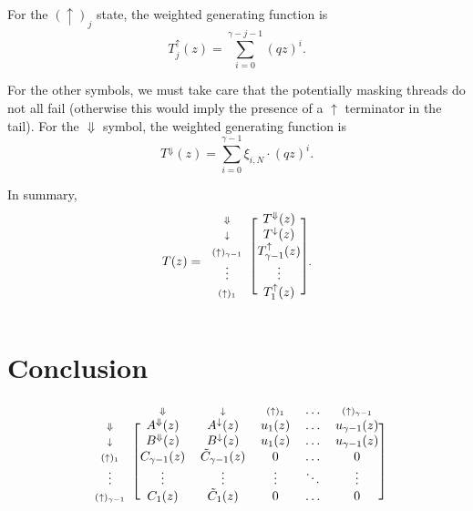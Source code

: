 \documentclass{article}
\newcommand{\DN}{\scriptstyle{\Downarrow}}
\newcommand{\dn}{\scriptstyle{\downarrow}}
\newcommand{\up}[1]{\scriptstyle{(\uparrow)_{#1}}}
\begin{document}
For the $(\uparrow)_j$ state, the weighted generating function is
\begin{equation}
T^\uparrow_j(z) = \sum_{i=0}^{\gamma-j-1} (qz)^i.
\end{equation}

For the other symbols, we must take care that the potentially masking
threads do not all fail (otherwise this would imply the presence of a
$\uparrow$ terminator in the tail). For the $\Downarrow$ symbol, the
weighted generating function is
\begin{equation}
T^\Downarrow(z) = \sum_{i=0}^{\gamma-1} \xi_{i,N} \cdot (qz)^i.
\end{equation}

In summary,
\begin{equation*}
T(z) = 
\begin{blockarray}{cc}
\begin{block}{c[c]}
\DN & T^\Downarrow(z) \\
\dn & T^\downarrow(z) \\
\up{\gamma-1} & T^\uparrow_{\gamma-1}(z) \\
\vdots & \vdots \\
\up{1} & \; T^\uparrow_1(z) \; \\
\end{block}
\end{blockarray}.
\end{equation*}


\section{Conclusion}

\begin{equation*}
\begin{blockarray}{cccccc}
   & \DN & \dn & \up{1} & \ldots & \up{\gamma-1} \\
\begin{block}{c[ccccc]}
\DN & A^\Downarrow(z) & A^\downarrow(z) & u_1(z)
    & \ldots & u_{\gamma-1}(z) \\
\dn & B^\Downarrow(z) & B^\downarrow(z) & u_1(z)
    & \ldots & u_{\gamma-1}(z) \\
\up{1} & C_{\gamma-1}(z) & \tilde{C}_{\gamma-1}(z) & 0 &
    \ldots & 0 \\
\vdots & \vdots & \vdots & \vdots & \ddots & \vdots \\
\up{\gamma-1} & C_1(z) & \tilde{C}_1(z) & 0 & \ldots & 0 \\
\end{block}
\end{blockarray}
\end{equation*}
\end{document}
